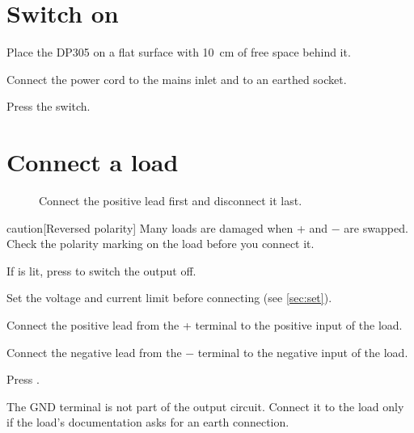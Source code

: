 \documentclass[type=manual, lang=en-GB, otherlangs={zh-HK}]{plaindoc}
\begin{document}
\section{Switch on}

\begin{steps}
\item Place the DP305 on a flat surface with \qty{10}{\cm} of free space behind it.
\item Connect the power cord to the mains inlet and to an earthed socket.
\item Press the  switch.
\end{steps}

\section{Connect a load}
\label{sec:connect}

\begin{figure}[h]
\pdwide{\centering\dpconnect}
\caption{Connect the positive lead first and disconnect it last.}
\label{fig:connect}
\end{figure}

\begin{safety}{caution}[Reversed polarity]
Many loads are damaged when + and − are swapped. Check the polarity marking
on the load before you connect it.
\end{safety}

\begin{steps}
\item If  is lit, press  to switch the output off.
\item Set the voltage and current limit before connecting (see \cref{sec:set}).
\item Connect the positive lead from the + terminal to the positive input of the load.
\item Connect the negative lead from the − terminal to the negative input of the load.
\item Press .
\end{steps}

\begin{note}
The GND terminal is not part of the output circuit. Connect it to the load
only if the load's documentation asks for an earth connection.
\end{note}
\end{document}
